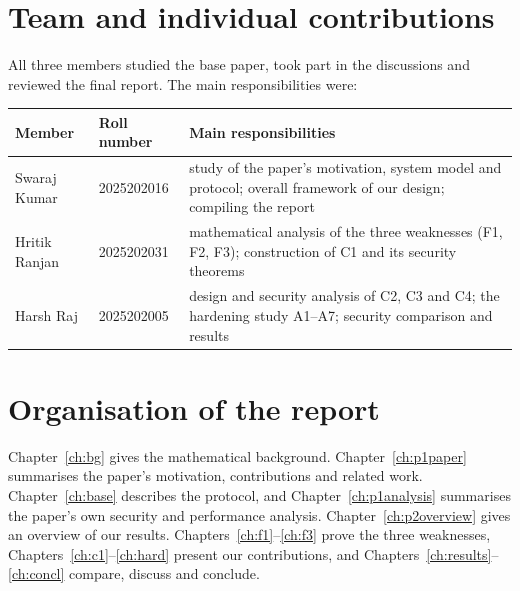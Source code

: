 \section{Team and individual contributions}
All three members studied the base paper, took part in the discussions and reviewed the final report. The main responsibilities were:
\begin{center}
\begin{tabularx}{\linewidth}{@{}l l X@{}}
\toprule
\textbf{Member} & \textbf{Roll number} & \textbf{Main responsibilities}\\
\midrule
Swaraj Kumar & 2025202016 & study of the paper's motivation, system model and protocol; overall framework of our design; compiling the report\\
Hritik Ranjan & 2025202031 & mathematical analysis of the three weaknesses (F1, F2, F3); construction of C1 and its security theorems\\
Harsh Raj & 2025202005 & design and security analysis of C2, C3 and C4; the hardening study A1--A7; security comparison and results\\
\bottomrule
\end{tabularx}
\end{center}

\section{Organisation of the report}
Chapter~\ref{ch:bg} gives the mathematical background. Chapter~\ref{ch:p1paper} summarises the paper's motivation, contributions and related work.
Chapter~\ref{ch:base} describes the protocol, and Chapter~\ref{ch:p1analysis} summarises the paper's own security and performance analysis.
Chapter~\ref{ch:p2overview} gives an overview of our results. Chapters~\ref{ch:f1}--\ref{ch:f3} prove the three weaknesses,
Chapters~\ref{ch:c1}--\ref{ch:hard} present our contributions, and Chapters~\ref{ch:results}--\ref{ch:concl} compare, discuss and conclude.
